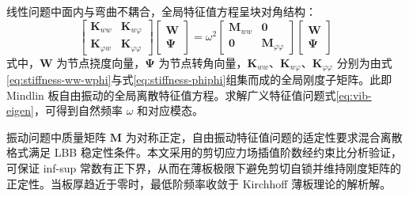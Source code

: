 线性问题中面内与弯曲不耦合，全局特征值方程呈块对角结构：
\begin{equation}
\begin{bmatrix}
\mathbf{K}_{ww} & \mathbf{K}_{w\varphi} \\
\mathbf{K}_{\varphi w} & \mathbf{K}_{\varphi\varphi}
\end{bmatrix}
\begin{bmatrix}
\mathbf{W} \\
\boldsymbol{\Psi}
\end{bmatrix}
= \omega^2
\begin{bmatrix}
\mathbf{M}_{ww} & \mathbf{0} \\
\mathbf{0} & \mathbf{M}_{\varphi\varphi}
\end{bmatrix}
\begin{bmatrix}
\mathbf{W} \\
\boldsymbol{\Psi}
\end{bmatrix}
\label{eq:vib-global-eigen}
\end{equation}
式中，$\mathbf{W}$ 为节点挠度向量，$\boldsymbol{\Psi}$ 为节点转角向量，$\mathbf{K}_{ww}$、$\mathbf{K}_{w\varphi}$、$\mathbf{K}_{\varphi\varphi}$ 分别为由式\eqref{eq:stiffness-ww-wphi}与式\eqref{eq:stiffness-phiphi}组集而成的全局刚度子矩阵。此即 Mindlin 板自由振动的全局离散特征值方程。求解广义特征值问题式\eqref{eq:vib-eigen}，可得到自然频率 $\omega$ 和对应模态。

振动问题中质量矩阵 $\mathbf{M}$ 为对称正定，自由振动特征值问题的适定性要求混合离散格式满足 LBB 稳定性条件。本文采用的剪切应力场插值阶数经约束比分析验证，可保证 inf-sup 常数有正下界，从而在薄板极限下避免剪切自锁并维持刚度矩阵的正定性。当板厚趋近于零时，最低阶频率收敛于 Kirchhoff 薄板理论的解析解。
